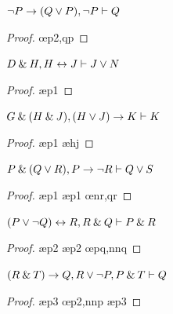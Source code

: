 \problempart
\begin{earg}
\item ${\neg} P \rightarrow (Q \vee P), {\neg} P \vdash Q$
\begin{proof}
	 \pr{}
	 \pr{}
	 
	 \oe{p2,qp}
\end{proof}
\medskip


\item $D \mathbin{\&} H, H \leftrightarrow J  \vdash J \vee N$ 
\begin{proof}
	 \pr{}
	 \pr{}
	 \ae{p1}
	 
	 
\end{proof}
\medskip

\filbreak

\item $G \mathbin{\&} (H \mathbin{\&} J), (H \vee J) \rightarrow K \vdash K$
\begin{proof}
	 \pr{}
	 \pr{}
	 \ae{p1}
	 \ae{hj}
	 
	 
\end{proof}
\medskip


\item $P \mathbin{\&} (Q \vee R), P \rightarrow {\neg} R \vdash Q \vee S$
\begin{proof}
	 \pr{}
	 \pr{}
	 \ae{p1}
	 
	 \ae{p1}
	 \oe{nr,qr}
	 
\end{proof}
\medskip

\filbreak

\item $(P \vee {\neg} Q) \leftrightarrow R, R \mathbin{\&} Q \vdash P \mathbin{\&} R$\smallskip
\begin{proof}
 \pr{}
 \pr{}
 \ae{p2}
 
 \ae{p2}
 
 \oe{pq,nnq}
 
\end{proof}
\medskip


\item $(R \mathbin{\&} T) \rightarrow Q, R \vee {\neg} P, P \mathbin{\&} T \vdash Q$\smallskip
\begin{proof}
 \pr{}
 \pr{}
 \pr{}
 \ae{p3}
 
 \oe{p2,nnp}
 \ae{p3}
 
 
\end{proof}
\medskip


\end{earg}
